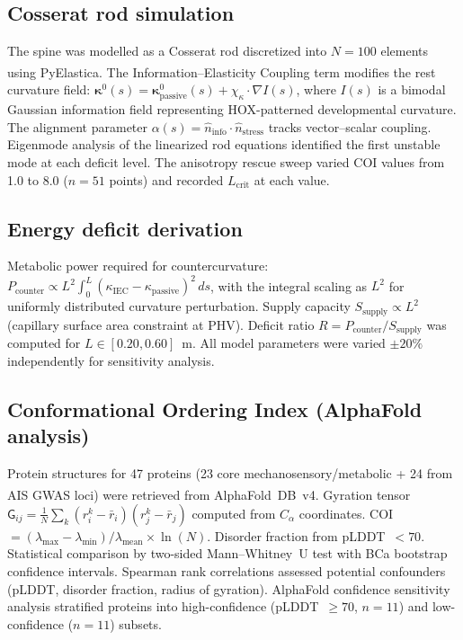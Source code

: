 \documentclass[12pt]{article}
\begin{document}
\subsection*{Cosserat rod simulation}
The spine was modelled as a Cosserat rod discretized into $N = 100$ elements using PyElastica\textsuperscript{\cite{naughton2021}}. The Information--Elasticity Coupling term modifies the rest curvature field: $\bm{\kappa}^0(s) = \bm{\kappa}^0_{\text{passive}}(s) + \chi_\kappa \cdot \nabla I(s)$, where $I(s)$ is a bimodal Gaussian information field representing HOX-patterned developmental curvature. The alignment parameter $\alpha(s) = \hat{n}_{\text{info}} \cdot \hat{n}_{\text{stress}}$ tracks vector--scalar coupling. Eigenmode analysis of the linearized rod equations identified the first unstable mode at each deficit level. The anisotropy rescue sweep varied COI values from 1.0 to 8.0 ($n = 51$ points) and recorded $L_{\text{crit}}$ at each value.

\subsection*{Energy deficit derivation}
Metabolic power required for countercurvature: $P_{\text{counter}} \propto L^2 \int_0^L (\kappa_{\text{IEC}} - \kappa_{\text{passive}})^2\,ds$, with the integral scaling as $L^2$ for uniformly distributed curvature perturbation. Supply capacity $S_{\text{supply}} \propto L^2$ (capillary surface area constraint at PHV). Deficit ratio $R = P_{\text{counter}}/S_{\text{supply}}$ was computed for $L \in [0.20, 0.60]$~m. All model parameters were varied $\pm 20\%$ independently for sensitivity analysis.

\subsection*{Conformational Ordering Index (AlphaFold analysis)}
Protein structures for 47 proteins (23 core mechanosensory/metabolic + 24 from AIS GWAS loci) were retrieved from AlphaFold~DB~v4\textsuperscript{\cite{jumper2021}}. Gyration tensor $\mathsf{G}_{ij} = \frac{1}{N}\sum_k (r^k_i - \bar{r}_i)(r^k_j - \bar{r}_j)$ computed from $C_\alpha$ coordinates. COI~$= (\lambda_{\max} - \lambda_{\min})/\lambda_{\text{mean}} \times \ln(N)$. Disorder fraction from pLDDT~$< 70$. Statistical comparison by two-sided Mann--Whitney~U test with BCa bootstrap confidence intervals. Spearman rank correlations assessed potential confounders (pLDDT, disorder fraction, radius of gyration). AlphaFold confidence sensitivity analysis stratified proteins into high-confidence (pLDDT~$\geq 70$, $n = 11$) and low-confidence ($n = 11$) subsets.
\end{document}
